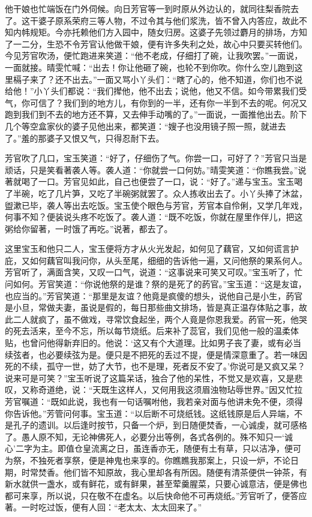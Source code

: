 \begin{parag}
    他干娘也忙端饭在门外伺候。向日芳官等一到时原从外边认的，就同往梨香院去了。这干婆子原系荣府三等人物，不过令其与他们浆洗，皆不曾入内答应，故此不知内帏规矩。今亦托赖他们方入园中，随女归房。这婆子先领过麝月的排场，方知了一二分，生恐不令芳官认他做干娘，便有许多失利之处，故心中只要买转他们。今见芳官吹汤，便忙跑进来笑道：“他不老成，仔细打了碗，让我吹罢。”一面说，一面就接。晴雯忙喊：“出去！你让他砸了碗，也轮不到你吹。你什么空儿跑到这里槅子来了？还不出去。”一面又骂小丫头们：“瞎了心的，他不知道，你们也不说给他！”小丫头们都说：“我们撵他，他不出去；说他，他又不信。如今带累我们受气，你可信了？我们到的地方儿，有你到的一半，还有你一半到不去的呢。何况又跑到我们到不去的地方还不算，又去伸手动嘴的了。”一面说，一面推他出去。阶下几个等空盒家伙的婆子见他出来，都笑道：“嫂子也没用镜子照一照，就进去了。”羞的那婆子又恨又气，只得忍耐下去。
\end{parag}


\begin{parag}
    芳官吹了几口，宝玉笑道：“好了，仔细伤了气。你尝一口，可好了？”芳官只当是顽话，只是笑看著袭人等。袭人道：“你就尝一口何妨。”晴雯笑道：“你瞧我尝。”说著就喝了一口。芳官见如此，自己也便尝了一口，说：“好了。”递与宝玉。宝玉喝了半碗，吃了几片笋，又吃了半碗粥就罢了。众人拣收出去了。小丫头捧了沐盆，盥漱已毕，袭人等出去吃饭。宝玉使个眼色与芳官，芳官本自伶俐，又学几年戏，何事不知？便装说头疼不吃饭了。袭人道：“既不吃饭，你就在屋里作伴儿，把这粥给你留著，一时饿了再吃。”说著，都去了。
\end{parag}


\begin{parag}
    这里宝玉和他只二人，宝玉便将方才从火光发起，如何见了藕官，又如何谎言护庇，又如何藕官叫我问你，从头至尾，细细的告诉他一遍，又问他祭的果系何人。芳官听了，满面含笑，又叹一口气，说道：“这事说来可笑又可叹。”宝玉听了，忙问如何。芳官笑道：“你说他祭的是谁？祭的是死了的菂官。”宝玉道：“这是友谊，也应当的。”芳官笑道：“那里是友谊？他竟是疯傻的想头，说他自己是小生，菂官是小旦，常做夫妻，虽说是假的，每日那些曲文排场，皆是真正温存体贴之事，故此二人就疯了，虽不做戏，寻常饮食起坐，两个人竟是你恩我爱。菂官一死，他哭的死去活来，至今不忘，所以每节烧纸。后来补了蕊官，我们见他一般的温柔体贴，也曾问他得新弃旧的。他说：‘这又有个大道理。比如男子丧了妻，或有必当续弦者，也必要续弦为是。便只是不把死的丢过不提，便是情深意重了。若一味因死的不续，孤守一世，妨了大节，也不是理，死者反不安了。’你说可是又疯又呆？说来可是可笑？”宝玉听说了这篇呆话，独合了他的呆性，不觉又是欢喜，又是悲叹，又称奇道绝，说：“天既生这样人，又何用我这须眉浊物玷辱世界。”因又忙拉芳官嘱道：“既如此说，我也有一句话嘱咐他，我若亲对面与他讲未免不便，须得你告诉他。”芳管问何事。宝玉道：“以后断不可烧纸钱。这纸钱原是后人异端，不是孔子的遗训。以后逢时按节，只备一个炉，到日随便焚香，一心诚虔，就可感格了。愚人原不知，无论神佛死人，必要分出等例，各式各例的。殊不知只一‘诚心’二字为主。即值仓皇流离之日，虽连香亦无，随便有土有草，只以洁净，便可为祭，不独死者享祭，便是神鬼也来享的。你瞧瞧我那案上，只设一炉，不论日期，时常焚香。他们皆不知原故，我心里却各有所因。随便有清茶便供一钟茶，有新水就供一盏水，或有鲜花，或有鲜果，甚至荤羹腥菜，只要心诚意洁，便是佛也都可来享，所以说，只在敬不在虚名。以后快命他不可再烧纸。”芳官听了，便答应著。一时吃过饭，便有人回：“老太太、太太回来了。”
\end{parag}
